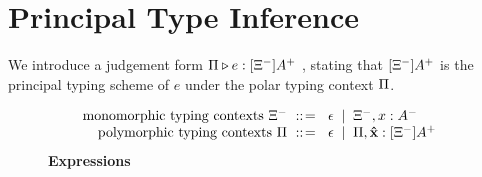 \section{Principal Type Inference}\label{principality}

We introduce a judgement form $\ctxp \triangleright e : [\ctxm^-]A^+$ , stating that $[\ctxm^-]A^+$  is the principal typing scheme of $e$ under the polar typing context $\ctxp$. 


\begin{figure}[!htb]
\begin{center}
\begin{framed}
\begin{minipage}[t]{0.95\columnwidth}
\[\begin{array}{r@{~}c@{~}l}
    \text{monomorphic typing contexts}~\ctxm^- & \bnfis {} & \epsilon \bnfor \ctxm^-, x : A^-\\
    \text{polymorphic typing contexts}~\ctxp & \bnfis {} & \epsilon \bnfor \ctxp, \letvar : [\ctxm^-]A^+\\
    \end{array}\]
    \textbf{Expressions}
    \begin{mathpar}
    
    
    
    
    

\end{mathpar}
\end{minipage}
\end{framed}
\end{center}
\end{figure}
